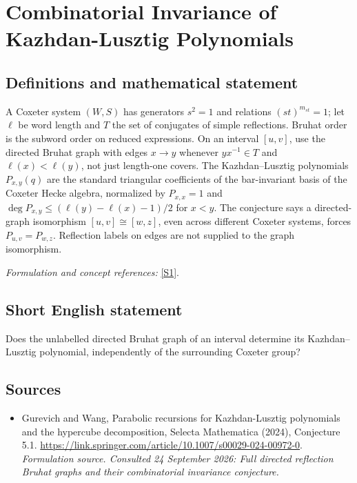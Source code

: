 \documentclass[11pt]{article}
\begin{document}
\section*{\texorpdfstring{Combinatorial Invariance of Kazhdan-Lusztig Polynomials}{Combinatorial Invariance of Kazhdan-Lusztig Polynomials}}\label{423}
\subsection{Definitions and mathematical statement}
A Coxeter system $(W,S)$ has generators $s^2=1$ and relations $(st)^{m_{st}}=1$; let $\ell$ be word length and $T$ the set of conjugates of simple reflections. Bruhat order is the subword order on reduced expressions. On an interval $[u,v]$, use the directed Bruhat graph with edges $x\to y$ whenever $yx^{-1}\in T$ and $\ell(x)<\ell(y)$, not just length-one covers. The Kazhdan--Lusztig polynomials $P_{x,y}(q)$ are the standard triangular coefficients of the bar-invariant basis of the Coxeter Hecke algebra, normalized by $P_{x,x}=1$ and $\deg P_{x,y}\le(\ell(y)-\ell(x)-1)/2$ for $x<y$. The conjecture says a directed-graph isomorphism $[u,v]\cong[w,z]$, even across different Coxeter systems, forces $P_{u,v}=P_{w,z}$. Reflection labels on edges are not supplied to the graph isomorphism.
\par\smallskip\textit{Formulation and concept references:} \href{https://link.springer.com/article/10.1007/s00029-024-00972-0}{[S1]}.

\subsection{Short English statement}
Does the unlabelled directed Bruhat graph of an interval determine its Kazhdan--Lusztig polynomial, independently of the surrounding Coxeter group?
\subsection{Sources}
\begin{itemize}
\item[S1]Gurevich and Wang, Parabolic recursions for Kazhdan-Lusztig polynomials and the hypercube decomposition, Selecta Mathematica (2024), Conjecture 5.1.
\url{https://link.springer.com/article/10.1007/s00029-024-00972-0}.
\textit{Formulation source. Consulted 24 September 2026: Full directed reflection Bruhat graphs and their combinatorial invariance conjecture.}
\end{itemize}
\end{document}
